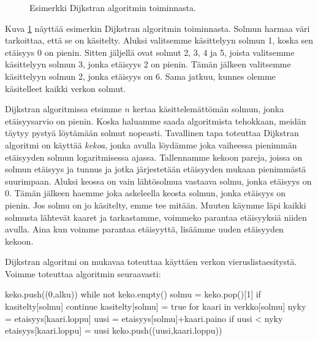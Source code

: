 \begin{figure}
\begin{center}
\end{center}
\caption{Esimerkki Dijkstran algoritmin toiminnasta.}
\label{fig:dijalg}
\end{figure}

Kuva \ref{fig:dijalg} näyttää esimerkin Dijkstran algoritmin
toiminnasta.
Solmun harmaa väri tarkoittaa, että se on käsitelty.
Aluksi valitsemme käsittelyyn solmun 1, koska sen etäisyys 0 on pienin.
Sitten jäljellä ovat solmut 2, 3, 4 ja 5,
joista valitsemme käsittelyyn solmun 3, jonka etäisyys 2 on pienin.
Tämän jälkeen valitsemme käsittelyyn solmun 2,
jonka etäisyys on 6.
Sama jatkuu, kunnes olemme käsitelleet kaikki verkon solmut.

Dijkstran algoritmissa etsimme $n$ kertaa
käsittelemättömän solmun, jonka etäisyysarvio on pienin.
Koska haluamme saada algoritmista tehokkaan,
meidän täytyy pystyä löytämään solmut nopeasti.
Tavallinen tapa toteuttaa Dijkstran algoritmi on käyttää \emph{kekoa},
jonka avulla löydämme joka vaiheessa pienimmän etäisyyden solmun
logaritmisessa ajassa.
Tallennamme kekoon pareja, joissa on solmun etäisyys ja tunnus
ja jotka järjestetään etäisyyden mukaan pienimmästä suurimpaan.
Aluksi keossa on vain lähtösolmua vastaava solmu,
jonka etäisyys on $0$.
Tämän jälkeen haemme joka askeleella keosta solmun,
jonka etäisyys on pienin.
Jos solmu on jo käsitelty, emme tee mitään.
Muuten käymme läpi kaikki solmusta lähtevät kaaret
ja tarkastamme, voimmeko parantaa etäisyyksiä
niiden avulla.
Aina kun voimme parantaa etäisyyttä,
lisäämme uuden etäisyyden kekoon.

Dijkstran algoritmi on mukavaa toteuttaa käyttäen
verkon vieruslistaesitystä.
Voimme toteuttaa algoritmin seuraavasti:

\begin{code}
keko.push((0,alku))
while not keko.empty()
    solmu = keko.pop()[1]
    if kasitelty[solmu]
        continue
    kasitelty[solmu] = true
    for kaari in verkko[solmu]
        nyky = etaisyys[kaari.loppu]
        uusi = etaisyys[solmu]+kaari.paino
        if uusi < nyky
            etaisyys[kaari.loppu] = uusi
            keko.push((uusi,kaari.loppu))
\end{code}

